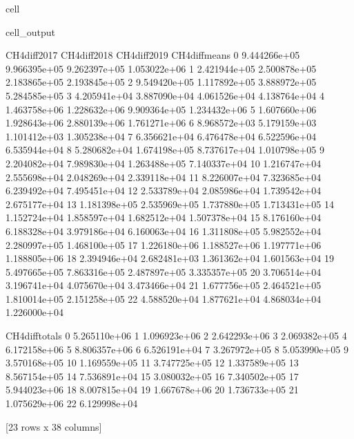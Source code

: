 \documentclass[letterpaper,10pt,english]{jupyterBook}
\begin{document}
\begin{sphinxuseclass}{cell}
\begin{sphinxVerbatimOutput}
\begin{sphinxuseclass}{cell_output}
\begin{sphinxVerbatim}[commandchars=\\\{\}]
    CH4\PYGZus{}diff\PYGZus{}2017 CH4\PYGZus{}diff\PYGZus{}2018  CH4\PYGZus{}diff\PYGZus{}2019  CH4\PYGZus{}diff\PYGZus{}means  \PYGZbs{}
0   \PYGZhy{}9.444266e+05 \PYGZhy{}9.966395e+05  \PYGZhy{}9.262397e+05   \PYGZhy{}1.053022e+06   
1   \PYGZhy{}2.421944e+05 \PYGZhy{}2.500878e+05  \PYGZhy{}2.183865e+05   \PYGZhy{}2.193845e+05   
2   \PYGZhy{}9.549420e+05 \PYGZhy{}1.117892e+05  \PYGZhy{}3.888972e+05   \PYGZhy{}5.284585e+05   
3    4.205941e+04  3.887090e+04   4.061526e+04    4.138764e+04   
4    1.463758e+06  1.228632e+06   9.909364e+05    1.234432e+06   
5   \PYGZhy{}1.607660e+06 \PYGZhy{}1.928643e+06  \PYGZhy{}2.880139e+06   \PYGZhy{}1.761271e+06   
6   \PYGZhy{}8.968572e+03  5.179159e+03   1.101412e+03    1.305238e+04   
7    6.356621e+04  6.476478e+04   6.522596e+04    6.535944e+04   
8    5.280682e+04  1.674198e+05   8.737617e+04    1.010798e+05   
9    2.204082e+04 \PYGZhy{}7.989830e+04  \PYGZhy{}1.263488e+05   \PYGZhy{}7.140337e+04   
10   1.216747e+04  2.555698e+04   2.048269e+04    2.339118e+04   
11   8.226007e+04  7.323685e+04   6.239492e+04    7.495451e+04   
12   2.533789e+04  2.085986e+04   1.739542e+04    2.675177e+04   
13  \PYGZhy{}1.181398e+05 \PYGZhy{}2.535969e+05  \PYGZhy{}1.737880e+05   \PYGZhy{}1.713431e+05   
14   1.152724e+04  1.858597e+04   1.682512e+04    1.507378e+04   
15   8.176160e+04  6.188328e+04   3.979186e+04    6.160063e+04   
16  \PYGZhy{}1.311808e+05 \PYGZhy{}5.982552e+04  \PYGZhy{}2.280997e+05   \PYGZhy{}1.468100e+05   
17   1.226180e+06  1.188527e+06   1.197771e+06    1.188805e+06   
18  \PYGZhy{}2.394946e+04 \PYGZhy{}2.682481e+03  \PYGZhy{}1.361362e+04   \PYGZhy{}1.601563e+04   
19   5.497665e+05  7.863316e+05   2.487897e+05    3.335357e+05   
20  \PYGZhy{}3.706514e+04 \PYGZhy{}3.196741e+04  \PYGZhy{}4.075670e+04   \PYGZhy{}3.473466e+04   
21   1.677756e+05  2.464521e+05   1.810014e+05    2.151258e+05   
22  \PYGZhy{}4.588520e+04  1.877621e+04   4.868034e+04   \PYGZhy{}1.226000e+04   

    CH4\PYGZus{}diff\PYGZus{}totals  
0     \PYGZhy{}5.265110e+06  
1     \PYGZhy{}1.096923e+06  
2     \PYGZhy{}2.642293e+06  
3      2.069382e+05  
4      6.172158e+06  
5     \PYGZhy{}8.806357e+06  
6      6.526191e+04  
7      3.267972e+05  
8      5.053990e+05  
9     \PYGZhy{}3.570168e+05  
10     1.169559e+05  
11     3.747725e+05  
12     1.337589e+05  
13    \PYGZhy{}8.567154e+05  
14     7.536891e+04  
15     3.080032e+05  
16    \PYGZhy{}7.340502e+05  
17     5.944023e+06  
18    \PYGZhy{}8.007815e+04  
19     1.667678e+06  
20    \PYGZhy{}1.736733e+05  
21     1.075629e+06  
22    \PYGZhy{}6.129998e+04  

[23 rows x 38 columns]
\end{sphinxVerbatim}

\end{sphinxuseclass}\end{sphinxVerbatimOutput}

\end{sphinxuseclass}
\end{document}
